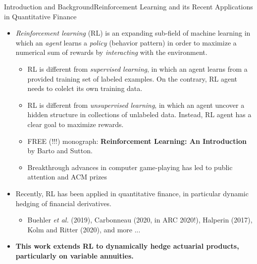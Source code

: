 \documentclass[10pt]{beamer}
\theoremstyle{definition}
\begin{document}
\begin{frame}{Introduction and Background}{Reinforcement Learning and its Recent Applications in Quantitative Finance}
\begin{itemize}
\item \textit{Reinforcement learning} (RL) is an expanding sub-field of machine learning in which an \textit{agent} learns a \textit{policy} (behavior pattern) in order to maximize a numerical sum of rewards by {\it interacting} with the environment.
\begin{itemize}
\item RL is different from \textit{supervised learning}, in which an agent learns from a provided training set of labeled examples. On the contrary, RL agent needs to colelct its own training data.
\item RL is different from \textit{unsupervised learning}, in which an agent uncover a hidden structure in collections of unlabeled data. Instead, RL agent has a clear goal to maximize rewards.
\item FREE (!!!) monograph: \textbf{Reinforcement Learning: An Introduction} by Barto and Sutton.
\item Breakthrough advances in computer game-playing has led to public attention and ACM prizes
\end{itemize}
\item Recently, RL has been applied in quantitative finance, in particular dynamic hedging of financial derivatives.
\begin{itemize}
\item Buehler {\it et al.} (2019), Carbonneau (2020, in ARC 2020!), Halperin (2017), Kolm and Ritter (2020), and more ...
\end{itemize}
\item {\bf This work extends RL to dynamically hedge actuarial products, particularly on variable annuities.}
\end{itemize}
\end{frame}
\end{document}
